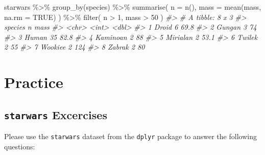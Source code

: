 \documentclass[
]{book}
\newenvironment{Shaded}{\begin{snugshade}}{\end{snugshade}}
\newcommand{\AttributeTok}[1]{\textcolor[rgb]{0.77,0.63,0.00}{#1}}
\newcommand{\CommentTok}[1]{\textcolor[rgb]{0.56,0.35,0.01}{\textit{#1}}}
\newcommand{\ConstantTok}[1]{\textcolor[rgb]{0.00,0.00,0.00}{#1}}
\newcommand{\DecValTok}[1]{\textcolor[rgb]{0.00,0.00,0.81}{#1}}
\newcommand{\FunctionTok}[1]{\textcolor[rgb]{0.00,0.00,0.00}{#1}}
\newcommand{\NormalTok}[1]{#1}
\newcommand{\SpecialCharTok}[1]{\textcolor[rgb]{0.00,0.00,0.00}{#1}}
\begin{document}
\begin{Shaded}
\begin{Highlighting}[]
\NormalTok{starwars }\SpecialCharTok{\%\textgreater{}\%}
  \FunctionTok{group\_by}\NormalTok{(species) }\SpecialCharTok{\%\textgreater{}\%}
  \FunctionTok{summarise}\NormalTok{(}
    \AttributeTok{n =} \FunctionTok{n}\NormalTok{(),}
    \AttributeTok{mass =} \FunctionTok{mean}\NormalTok{(mass, }\AttributeTok{na.rm =} \ConstantTok{TRUE}\NormalTok{)}
\NormalTok{  ) }\SpecialCharTok{\%\textgreater{}\%}
  \FunctionTok{filter}\NormalTok{(}
\NormalTok{    n }\SpecialCharTok{\textgreater{}} \DecValTok{1}\NormalTok{,}
\NormalTok{    mass }\SpecialCharTok{\textgreater{}} \DecValTok{50}
\NormalTok{  )}
\CommentTok{\#\textgreater{} \# A tibble: 8 x 3}
\CommentTok{\#\textgreater{}   species      n  mass}
\CommentTok{\#\textgreater{}   \textless{}chr\textgreater{}    \textless{}int\textgreater{} \textless{}dbl\textgreater{}}
\CommentTok{\#\textgreater{} 1 Droid        6  69.8}
\CommentTok{\#\textgreater{} 2 Gungan       3  74  }
\CommentTok{\#\textgreater{} 3 Human       35  82.8}
\CommentTok{\#\textgreater{} 4 Kaminoan     2  88  }
\CommentTok{\#\textgreater{} 5 Mirialan     2  53.1}
\CommentTok{\#\textgreater{} 6 Twi\textquotesingle{}lek      2  55  }
\CommentTok{\#\textgreater{} 7 Wookiee      2 124  }
\CommentTok{\#\textgreater{} 8 Zabrak       2  80}
\end{Highlighting}
\end{Shaded}

\hypertarget{practice}{%
\chapter{Practice}\label{practice}}

\hypertarget{starwars-excercises}{%
\section{\texorpdfstring{\texttt{starwars} Excercises}{starwars Excercises}}\label{starwars-excercises}}

Please use the \texttt{starwars} dataset from the \texttt{dplyr} package to answer the following questions:
\end{document}
